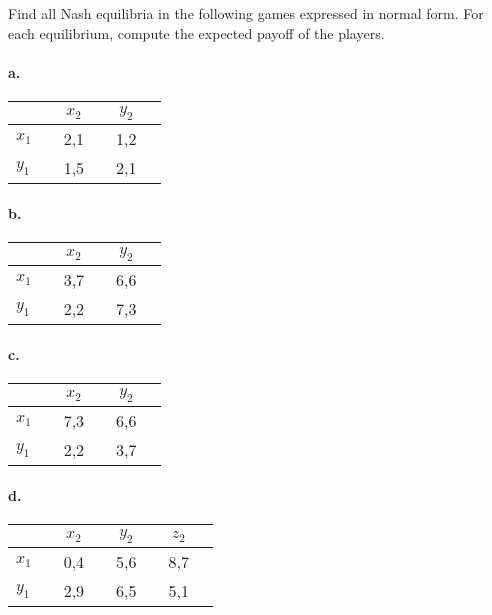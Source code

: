 \documentclass{../ape}
\begin{document}

\section{}
Find all Nash equilibria in the following games expressed in normal form. For each equilibrium, compute the expected payoff of the players. 

	\paragraph{a. }	
	\vspace{-.5cm}
	\begin{center}
		\begin{tabular}[h!]{l|ccccc}
			&& \Large{$x_2$} && \Large{$y_2$} & \\
			\hline
			\Large{$x_1$} && \Large{2,1} && \Large{1,2} & \\
			\Large{$y_1$} && \Large{1,5} && \Large{2,1} & 
		\end{tabular} 
	\end{center}
	\paragraph{b. }
	\vspace{-.5cm}
	\begin{center}
		\begin{tabular}[h!]{l|ccccc}
			&& \Large{$x_2$} && \Large{$y_2$} & \\
			\hline
			\Large{$x_1$} && \Large{3,7} && \Large{6,6} & \\
			\Large{$y_1$} && \Large{2,2} && \Large{7,3} & 
		\end{tabular} 
	\end{center}
	\paragraph{c. }
	\vspace{-.5cm}
	\begin{center}
		\begin{tabular}[h!]{l|ccccc}
			&& \Large{$x_2$} && \Large{$y_2$} & \\
			\hline
			\Large{$x_1$} && \Large{7,3} && \Large{6,6} & \\
			\Large{$y_1$} && \Large{2,2} && \Large{3,7} & 
		\end{tabular} 
	\end{center}
	\paragraph{d. }
	\vspace{-.5cm}
	\begin{center}
		\begin{tabular}[h!]{l|ccccccc}
			&& \Large{$x_2$} && \Large{$y_2$} && \Large{$z_2$} & \\
			\hline
			\Large{$x_1$} && \Large{0,4} && \Large{5,6} && \Large{8,7} & \\
			\Large{$y_1$} && \Large{2,9} && \Large{6,5} && \Large{5,1} & 
		\end{tabular} 
	\end{center}
\end{document}

